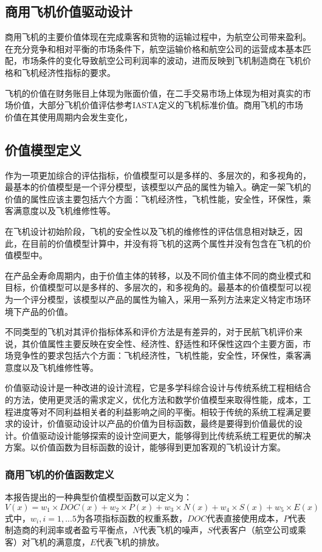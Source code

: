 \documentclass[12pt,a4paper]{report}
\begin{document}
\subsection{商用飞机价值驱动设计}

商用飞机的主要价值体现在完成乘客和货物的运输过程中，为航空公司带来盈利。在充分竞争和相对平衡的市场条件下，航空运输价格和航空公司的运营成本基本匹配，市场条件的变化导致航空公司利润率的波动，进而反映到飞机制造商在飞机价格和飞机经济性指标的要求。

飞机的价值在财务账目上体现为账面价值，在二手交易市场上体现为相对真实的市场价值，大部分飞机价值评估参考IASTA定义的飞机标准价值。商用飞机的市场价值在其使用周期内会发生变化，

\subsection{价值模型定义}

作为一项更加综合的评估指标，价值模型可以是多样的、多层次的，和多视角的，最基本的价值模型是一个评分模型，该模型以产品的属性为输入。确定一架飞机的价值的属性应该主要包括六个方面：飞机经济性，飞机性能，安全性，环保性，乘客满意度以及飞机维修性等。

在飞机设计初始阶段，飞机的安全性以及飞机的维修性的评估信息相对缺乏，因此，在目前的价值模型计算中，并没有将飞机的这两个属性并没有包含在飞机的价值模型中。 

在产品全寿命周期内，由于价值主体的转移，以及不同价值主体不同的商业模式和目标，价值模型可以是多样的、多层次的，和多视角的。最基本的价值模型可以视为一个评分模型，该模型以产品的属性为输入，采用一系列方法来定义特定市场环境下产品的价值。

不同类型的飞机对其评价指标体系和评价方法是有差异的，对于民航飞机评价来说，其价值属性主要反映在安全性、经济性、舒适性和环保性这四个主要方面，市场竞争性的要求包括六个方面：飞机经济性，飞机性能，安全性，环保性，乘客满意度以及飞机维修性等。

价值驱动设计是一种改进的设计流程，它是多学科综合设计与传统系统工程相结合的方法，使用更灵活的需求定义，优化方法和数学价值模型来取得性能，成本，工程进度等对不同利益相关者的利益影响之间的平衡。相较于传统的系统工程满足要求的设计，价值驱动设计以产品的价值为目标函数，最终是要得到价值最优的设计。价值驱动设计能够探索的设计空间更大，能够得到比传统系统工程更优的解决方案。以价值函数为目标函数的设计，能够得到更加客观的飞机设计方案。

\subsubsection{商用飞机的价值函数定义}\label{valuefunction}
本报告提出的一种典型价值模型函数可以定义为：
\begin{equation}
\label{valuefun}
V(x)=w_1\times DOC(x)+w_2 \times P(x)+w_3 \times N(x)+w_4\times S(x) + w_5 \times E(x)
\end{equation}
式中，$w_i, i=1,...5$为各项指标函数的权重系数，$DOC$代表直接使用成本，$P$代表制造商的利润率或者盈亏平衡点，$N$代表飞机的噪声，$S$代表客户（航空公司或乘客）对飞机的满意度，$E$代表飞机的排放。
\end{document}
